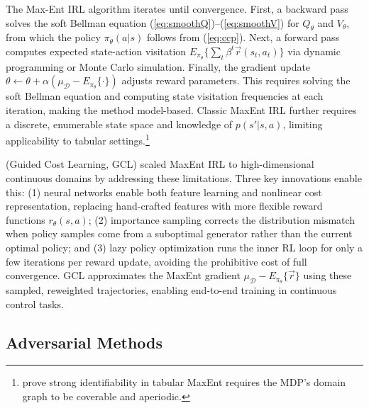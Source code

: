The Max-Ent IRL algorithm \citep{ziebart:2010} iterates until convergence. First, a backward pass solves the soft Bellman equation (\ref{eq:smoothQ})--(\ref{eq:smoothV}) for $Q_\theta$ and $V_\theta$, from which the policy $\pi_\theta(a|s)$ follows from (\ref{eq:ccp}). Next, a forward pass computes expected state-action visitation $E_{\pi_\theta}\{\sum_t \beta^t \vec{r}(s_t,a_t)\}$ via dynamic programming or Monte Carlo simulation. Finally, the gradient update $\theta \leftarrow \theta + \alpha(\mu_{\mathcal{D}} - E_{\pi_\theta}\{\cdot\})$ adjusts reward parameters. This requires solving the soft Bellman equation and computing state visitation frequencies at each iteration, making the method model-based. Classic MaxEnt IRL further requires a discrete, enumerable state space and knowledge of $p(s'|s,a)$, limiting applicability to tabular settings.\footnote{\footnotesize \citet{kim:2021} prove strong identifiability in tabular MaxEnt requires the MDP's domain graph to be coverable and aperiodic.}

\citet{guidedcostlearning:2016} (Guided Cost Learning, GCL) scaled MaxEnt IRL to high-dimensional continuous domains by addressing these limitations. Three key innovations enable this: (1) neural networks enable both feature learning and nonlinear cost representation, replacing hand-crafted features with more flexible reward functions $r_\theta(s,a)$; (2) importance sampling corrects the distribution mismatch when policy samples come from a suboptimal generator rather than the current optimal policy; and (3) lazy policy optimization runs the inner RL loop for only a few iterations per reward update, avoiding the prohibitive cost of full convergence. GCL approximates the MaxEnt gradient $\mu_{\mathcal{D}} - E_{\pi_\theta}\{\vec{r}\}$ using these sampled, reweighted trajectories, enabling end-to-end training in continuous control tasks.

\subsection{Adversarial Methods}

